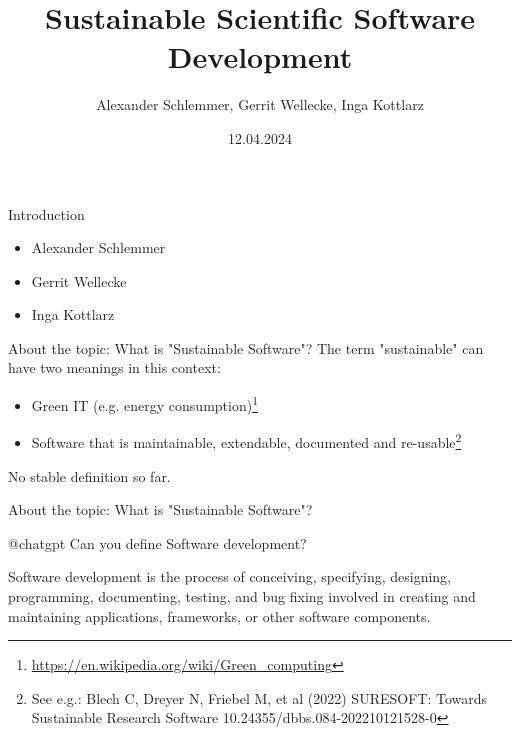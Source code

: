 \documentclass[aspectratio=169,graphics,handout]{beamer}
\title[12.04.2024 - Sustainable Scientific Software Development]{Sustainable Scientific Software Development}
\author[Schlemmer, Wellecke, Kottlarz]{Alexander Schlemmer, Gerrit Wellecke, Inga Kottlarz}
\institute{}
\date{12.04.2024}
\begin{document}
\maketitle

\begin{frame}{Introduction}
    \begin{itemize}
        \item Alexander Schlemmer
        \item Gerrit Wellecke
        \item Inga Kottlarz
    \end{itemize}
\end{frame}

\begin{frame}{About the topic: What is "Sustainable Software"?}
    The term "sustainable" can have two meanings in this context:
    \begin{itemize}
        \item Green IT (e.g. energy consumption)\footnote{\url{https://en.wikipedia.org/wiki/Green_computing}}
        \item Software that is maintainable, extendable, documented and re-usable\footnote{See e.g.: Blech C, Dreyer N, Friebel M, et al (2022) SURESOFT: Towards Sustainable Research Software 10.24355/dbbs.084-202210121528-0} %
    \end{itemize}

    No stable definition so far.

\end{frame}


\begin{frame}{About the topic: What is "Sustainable Software"?}

    \begin{block}{@chatgpt Can you define Software development?}

        Software development is the process of conceiving, specifying, designing, programming, documenting, testing, and bug fixing involved in creating and maintaining applications, frameworks, or other software components.
    \end{block}

\end{frame}
\end{document}
